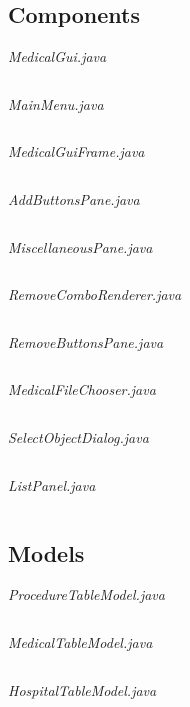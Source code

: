 \documentclass{article}
\begin{document}
\subsection{Components}\label{subsec:components} %
\textit{MedicalGui.java}\label{MedicalGui.java}
\inputminted{java}{./src/main/java/com/yvesstraten/medicalconsolegui/MedicalGui.java}

\textit{MainMenu.java}
\inputminted{java}{./src/main/java/com/yvesstraten/medicalconsolegui/components/MainMenu.java}

\textit{MedicalGuiFrame.java}
\inputminted{java}{./src/main/java/com/yvesstraten/medicalconsolegui/components/MedicalGuiFrame.java}

\textit{AddButtonsPane.java}
\inputminted{java}{./src/main/java/com/yvesstraten/medicalconsolegui/components/AddButtonsPane.java}

\textit{MiscellaneousPane.java}
\inputminted{java}{./src/main/java/com/yvesstraten/medicalconsolegui/components/MiscellaneousPane.java}

\textit{RemoveComboRenderer.java}
\inputminted{java}{./src/main/java/com/yvesstraten/medicalconsolegui/RemoveComboRenderer.java}

\textit{RemoveButtonsPane.java}
\inputminted{java}{./src/main/java/com/yvesstraten/medicalconsolegui/components/RemoveButtonsPane.java}

\textit{MedicalFileChooser.java}
\inputminted{java}{./src/main/java/com/yvesstraten/medicalconsolegui/components/MedicalFileChooser.java}

\textit{SelectObjectDialog.java}
\inputminted{java}{./src/main/java/com/yvesstraten/medicalconsolegui/components/SelectObjectDialog.java}

\textit{ListPanel.java}
\inputminted{java}{./src/main/java/com/yvesstraten/medicalconsolegui/components/ListPanel.java}

\subsection{Models}\label{sec:models} %
\textit{ProcedureTableModel.java}
\inputminted{java}{./src/main/java/com/yvesstraten/medicalconsolegui/models/ProcedureTableModel.java}

\textit{MedicalTableModel.java}
\inputminted{java}{./src/main/java/com/yvesstraten/medicalconsolegui/models/MedicalTableModel.java}

\textit{HospitalTableModel.java}
\inputminted{java}{./src/main/java/com/yvesstraten/medicalconsolegui/models/HospitalTableModel.java}
\end{document}
